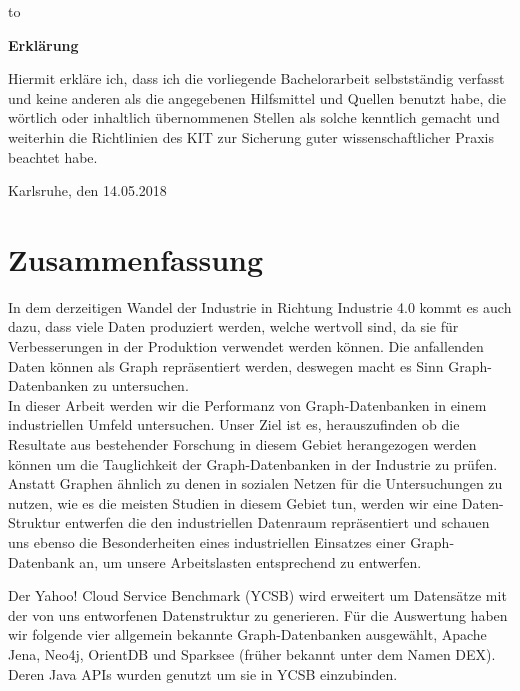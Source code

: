 \thispagestyle{empty}
\vspace*{37\baselineskip}
\hbox to \textwidth{\hrulefill}
\par
\textbf{Erklärung}

Hiermit erkl\"are ich,
dass ich die vorliegende Bachelorarbeit selbstst\"andig verfasst und keine anderen als die angegebenen Hilfsmittel und Quellen benutzt habe,
die w\"ortlich oder inhaltlich \"ubernommenen Stellen als solche kenntlich gemacht und weiterhin die Richtlinien des KIT zur Sicherung guter wissenschaftlicher Praxis beachtet habe.

Karlsruhe, den 14.05.2018

\cleardoublepage


\chapter*{Zusammenfassung}

In dem derzeitigen Wandel der Industrie in Richtung Industrie 4.0 kommt es auch dazu,
dass viele Daten produziert werden,
welche wertvoll sind,
da sie für Verbesserungen in der Produktion verwendet werden können.
Die anfallenden Daten können als Graph repräsentiert werden,
deswegen macht es Sinn Graph-Datenbanken zu untersuchen.\\
In dieser Arbeit werden wir die Performanz von Graph-Datenbanken in einem industriellen Umfeld untersuchen.
Unser Ziel ist es,
herauszufinden ob die Resultate aus bestehender Forschung in diesem Gebiet herangezogen werden können um die Tauglichkeit der Graph-Datenbanken in der Industrie zu prüfen.
Anstatt Graphen ähnlich zu denen in sozialen Netzen für die Untersuchungen zu nutzen,
wie es die meisten Studien in diesem Gebiet tun,
werden wir eine Daten-Struktur entwerfen die den industriellen Datenraum repräsentiert und schauen uns ebenso die Besonderheiten eines industriellen Einsatzes einer Graph-Datenbank an,
um unsere Arbeits\-lasten entsprechend zu entwerfen.

Der Yahoo! Cloud Service Benchmark (YCSB) wird erweitert um Datensätze mit der von uns entworfenen Datenstruktur zu generieren.
Für die Auswertung haben wir folgende vier allgemein bekannte Graph-Datenbanken ausgewählt,
Apache Jena, Neo4j, OrientDB und Sparksee (früher bekannt unter dem Namen DEX).
Deren Java APIs wurden genutzt um sie in YCSB einzubinden.


